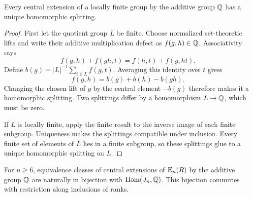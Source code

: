 \begin{lemma}\label{st:finite-splitting}
Every central extension of a locally finite group by the additive
group $\mathbb Q$ has a unique homomorphic splitting.
\end{lemma}

\begin{proof}
First let the quotient group $L$ be finite. Choose normalized
set-theoretic lifts and write their additive multiplication defect
as $f(g,h)\in\mathbb Q$. Associativity says
\[
 f(g,h)+f(gh,t)=f(h,t)+f(g,ht).
\]
Define $b(g)=|L|^{-1}\sum_{t\in L}f(g,t)$. Averaging this identity
over $t$ gives
\[
 f(g,h)=b(g)+b(h)-b(gh).
\]
Changing the chosen lift of $g$ by the central element $-b(g)$
therefore makes it a homomorphic splitting. Two splittings differ
by a homomorphism $L\to\mathbb Q$, which must be zero.

If $L$ is locally finite, apply the finite result to the inverse
image of each finite subgroup. Uniqueness makes the splittings
compatible under inclusion. Every finite set of elements of $L$
lies in a finite subgroup, so these splittings glue to a unique
homomorphic splitting on $L$.
\end{proof}

\begin{lemma}\label{st:extensions}
For $n\geq6$, equivalence classes of central extensions of
$\operatorname{E}_n(R)$ by the additive group $\mathbb Q$ are naturally in bijection
with $\operatorname{Hom}(J_n,\mathbb Q)$. This bijection commutes with restriction
along inclusions of ranks.
\end{lemma}

